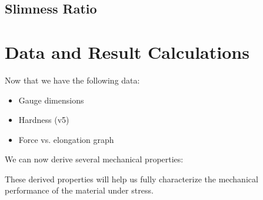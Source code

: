 \documentclass{article}
\begin{document}
    \subsection{Slimness Ratio}




    
    
    \newpage\vspace*{-20pt}
    
    \section{Data and Result Calculations}
    
    Now that we have the following data:
    \begin{itemize}
        \item Gauge dimensions
        \item Hardness (v5)
        \item Force vs. elongation graph
    \end{itemize}
    We can now derive several mechanical properties:
    
    These derived properties will help us fully characterize the mechanical performance of the material under stress.
    \newpage
\end{document}
